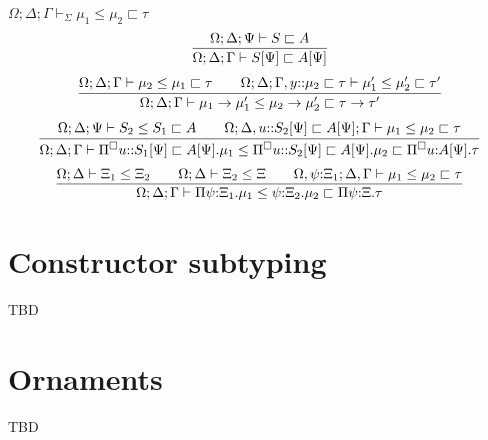 \documentclass[letterpaper, 11pt]{article}
\newcommand{\rar}{\rightarrow}
\begin{document}
    $\boxed{\Omega; \Delta; \Gamma \vdash_\Sigma \mu_1 \leq \mu_2 \sqsubset \tau}$
    \begin{align*}
      \infer{\Omega; \Delta; \Gamma \vdash S[\Psi] \sqsubset A[\Psi]}
            {
              \Omega; \Delta; \Psi \vdash S \sqsubset A
            }
    \end{align*}
    \begin{align*}
      \infer{\Omega; \Delta; \Gamma \vdash\mu_1 \rar \mu_1' \leq \mu_2 \rar \mu_2' \sqsubset \tau \rar \tau'}
            {
              \Omega; \Delta; \Gamma \vdash \mu_2 \leq \mu_1 \sqsubset \tau
              &&
              \Omega; \Delta; \Gamma, y{::} \mu_2 \sqsubset \tau \vdash \mu_1' \leq \mu_2' \sqsubset \tau'
            }
    \end{align*}
    \begin{align*}
      \infer{\Omega; \Delta; \Gamma \vdash\Pi^\square u{::}S_1[\Psi] \sqsubset A[\Psi]. \mu_1 
                                             \leq \Pi^\square u{::}S_2[\Psi] \sqsubset A[\Psi]. \mu_2 \sqsubset \Pi^\square u{:} A[\Psi]. \tau}
            {
              \Omega; \Delta; \Psi \vdash S_2 \leq S_1 \sqsubset A
              &&
              \Omega; \Delta, u{::} S_2[\Psi] \sqsubset A[\Psi]; \Gamma \vdash \mu_1 \leq \mu_2 \sqsubset \tau
            }
    \end{align*}
    \begin{align*}
      \infer{\Omega; \Delta; \Gamma \vdash \Pi \psi{:}\Xi_1. \mu_1 \leq \psi{:}\Xi_2. \mu_2 \sqsubset \Pi \psi{:}\Xi. \tau}
            {
              \Omega; \Delta \vdash \Xi_1 \leq \Xi_2
              &&
              \Omega; \Delta \vdash \Xi_2 \leq \Xi
              &&
              \Omega, \psi{:}\Xi_1; \Delta, \Gamma \vdash \mu_1 \leq \mu_2 \sqsubset \tau
            }
    \end{align*}

    \section{Constructor subtyping}
    TBD

    \section{Ornaments}
    TBD

    
        
\end{document}
